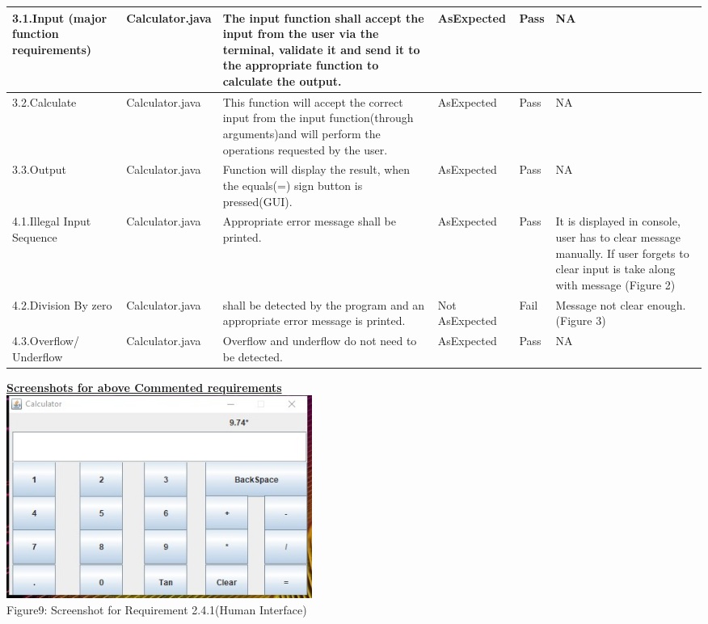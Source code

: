 \documentclass[a4paper,12pt]{article}
\begin{document}
\begin{titlepage}
\begin{center}
\begin{tabular}{ | m{5em} | m{3cm}| m{3cm} | m{2cm}|m{2cm}|m{3cm}| }
    3.1.Input (major function requirements)  & Calculator.java  & The input function shall accept the input from the user via the terminal, validate it and send it to the appropriate function to calculate the output. & AsExpected & Pass & NA\\
  \hline
   3.2.Calculate  & Calculator.java  & This function will accept the correct input from the input function(through arguments)and will perform the operations requested by the user. & AsExpected & Pass & NA\\
   \hline
   3.3.Output & Calculator.java & Function will display the result, when the equals(=) sign button is pressed(GUI). & AsExpected & Pass & NA\\
  \hline
  4.1.Illegal Input Sequence & Calculator.java & Appropriate error message shall be printed. & AsExpected & Pass & It is displayed in console, user has to clear message manually. If user forgets to clear input is take along with message (Figure 2)\\
  \hline
  4.2.Division By zero & Calculator.java & shall be detected by the program and an appropriate error message is printed. & Not AsExpected & Fail & Message not clear enough. (Figure 3)\\
  \hline
  4.3.Overflow/ Underflow & Calculator.java & Overflow and underflow do not need to be detected. & AsExpected & Pass & NA \\
  \hline
  \hline
\end{tabular}
\end{center}
\newpage
\noindent
\underline{\textbf{Screenshots for above Commented requirements}}\\
\newline
\newline
\includegraphics[width=10.0cm]{F9.jpg}\\
Figure9: Screenshot for Requirement 2.4.1(Human Interface) \\

\end{titlepage}
\end{document}
